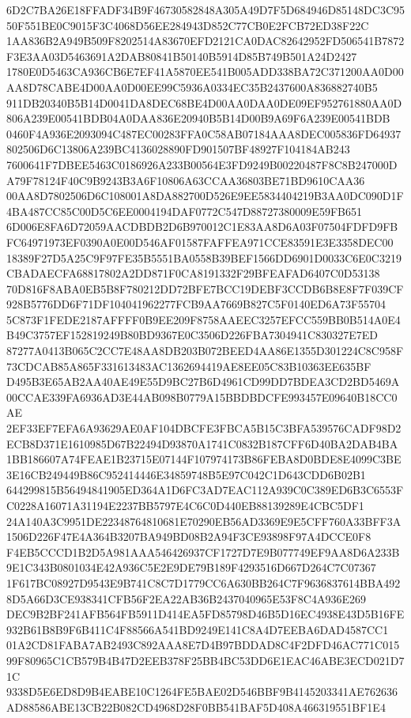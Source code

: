 \documentclass[UTF8,fontset=fandol,zihao=-4,a4paper]{ctexart}
\begin{document}
{{6D2C7BA26E18FFADF34B9F46730582848A305A49D7F5D684946D85148DC3C9550F551BE0C9015F3C4068D56EE284943D852C77CB0E2FCB72ED38F22C
1AA836B2A949B509F8202514A83670EFD2121CA0DAC82642952FD506541B7872F3E3AA03D5463691A2DAB80841B50140B5914D85B749B501A24D2427
1780E0D5463CA936CB6E7EF41A5870EE541B005ADD338BA72C371200AA0D00AA8D78CABE4D00AA0D00EE99C5936A0334EC35B2437600A836882740B5
911DB20340B5B14D0041DA8DEC68BE4D00AA0DAA0DE09EF952761880AA0D806A239E00541BDB04A0DAA836E20940B5B14D00B9A69F6A239E00541BDB
0460F4A936E2093094C487EC00283FFA0C58AB07184AAA8DEC005836FD64937802506D6C13806A239BC4136028890FD901507BF48927F104184AB243
7600641F7DBEE5463C0186926A233B00564E3FD9249B00220487F8C8B247000DA79F78124F40C9B9243B3A6F10806A63CCAA36803BE71BD9610CAA36
00AA8D7802506D6C108001A8DA882700D526E9EE5834404219B3AA0DC090D1F4BA487CC85C00D5C6EE0004194DAF0772C547D88727380009E59FB651
6D006E8FA6D72059AACDBDB2D6B970012C1E83AA8D6A03F07504FDFD9FBFC64971973EF0390A0E00D546AF01587FAFFEA971CCE83591E3E3358DEC00
18389F27D5A25C9F97FE35B5551BA0558B39BEF1566DD6901D0033C6E0C3219CBADAECFA68817802A2DD871F0CA8191332F29BFEAFAD6407C0D53138
70D816F8ABA0EB5B8F780212DD72BFE7BCC19DEBF3CCDB6B8E8F7F039CF928B5776DD6F71DF104041962277FCB9AA7669B827C5F0140ED6A73F55704
5C873F1FEDE2187AFFFF0B9EE209F8758AAEEC3257EFCC559BB0B514A0E4B49C3757EF152819249B80BD9367E0C3506D226FBA7304941C830327E7ED
87277A0413B065C2CC7E48AA8DB203B072BEED4AA86E1355D301224C8C958F73CDCAB85A865F331613483AC1362694419AE8EE05C83B10363EE635BF
D495B3E65AB2AA40AE49E55D9BC27B6D4961CD99DD7BDEA3CD2BD5469A00CCAE339FA6936AD3E44AB098B0779A15BBDBDCFE993457E09640B18CC0AE
2EF33EF7EFA6A93629AE0AF104DBCFE3FBCA5B15C3BFA539576CADF98D2ECB8D371E1610985D67B22494D93870A1741C0832B187CFF6D40BA2DAB4BA
1BB186607A74FEAE1B23715E07144F107974173B86FEBA8D0BDE8E4099C3BE3E16CB249449B86C952414446E34859748B5E97C042C1D643CDD6B02B1
644299815B56494841905ED364A1D6FC3AD7EAC112A939C0C389ED6B3C6553FC0228A16071A31194E2237BB5797E4C6C0D440EB88139289E4CBC5DF1
24A140A3C9951DE22348764810681E70290EB56AD3369E9E5CFF760A33BFF3A1506D226F47E4A364B3207BA949BD08B2A94F3CE93898F97A4DCCE0F8
F4EB5CCCD1B2D5A981AAA546426937CF1727D7E9B077749EF9AA8D6A233B9E1C343B0801034E42A936C5E2E9DE79B189F4293516D667D264C7C07367
1F617BC08927D9543E9B741C8C7D1779CC6A630BB264C7F9636837614BBA4928D5A66D3CE938341CFB56F2EA22AB36B2437040965E53F8C4A936E269
DEC9B2BF241AFB564FB5911D414EA5FD85798D46B5D16EC4938E43D5B16FE932B61B8B9F6B411C4F88566A541BD9249E141C8A4D7EEBA6DAD4587CC1
01A2CD81FABA7AB2493C892AAA8E7D4B97BDDAD8C4F2DFD46AC771C01599F80965C1CB579B4B47D2EEB378F25BB4BC53DD6E1EAC46ABE3ECD021D71C
9338D5E6ED8D9B4EABE10C1264FE5BAE02D546BBF9B4145203341AE762636AD88586ABE13CB22B082CD4968D28F0BB541BAF5D408A466319551BF1E4
}}
\end{document}
